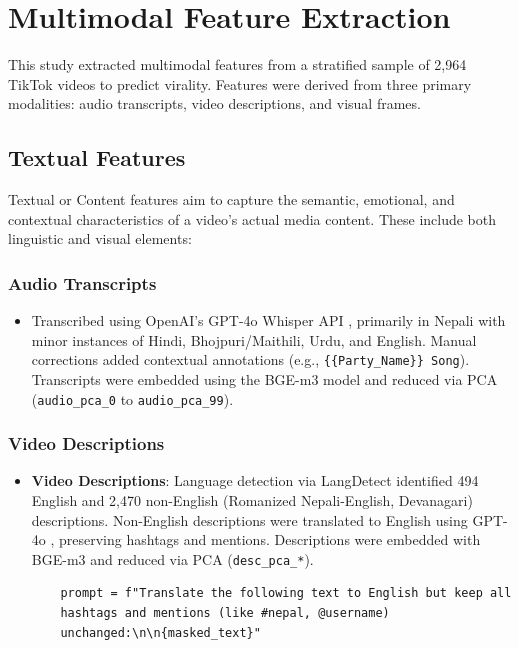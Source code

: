 \documentclass[12pt,a4paper]{report}
\begin{document}
\section{Multimodal Feature Extraction}

This study extracted multimodal features from a stratified sample of 2,964 TikTok videos to predict virality. Features were derived from three primary modalities: audio transcripts, video descriptions, and visual frames.

\subsection{Textual Features}
Textual or Content features aim to capture the semantic, emotional, and contextual characteristics of a video’s actual media content. These include both linguistic and visual elements:

\subsubsection{Audio Transcripts}

\begin{itemize}
    \item Transcribed using OpenAI’s GPT-4o Whisper API \parencite{OpenAI2024gpt4o}, primarily in Nepali with minor instances of Hindi, Bhojpuri/Maithili, Urdu, and English. Manual corrections added contextual annotations (e.g., \texttt{\{\{Party\_Name\}\} Song}). Transcripts were embedded using the BGE-m3 model \parencite{bge-m3} and reduced via PCA (\texttt{audio\_pca\_0} to \texttt{audio\_pca\_99}).
\end{itemize}

\subsubsection{Video Descriptions}

\begin{itemize}
    \item \textbf{Video Descriptions}: Language detection via LangDetect \parencite{langdetect} identified 494 English and 2,470 non-English (Romanized Nepali-English, Devanagari) descriptions. Non-English descriptions were translated to English using GPT-4o \parencite{OpenAI2024gpt4o}, preserving hashtags and mentions. Descriptions were embedded with BGE-m3 and reduced via PCA (\texttt{desc\_pca\_*}).

    \begin{verbatim}
    prompt = f"Translate the following text to English but keep all 
    hashtags and mentions (like #nepal, @username) 
    unchanged:\n\n{masked_text}"
    \end{verbatim}
\end{itemize}
\newpage
\end{document}
